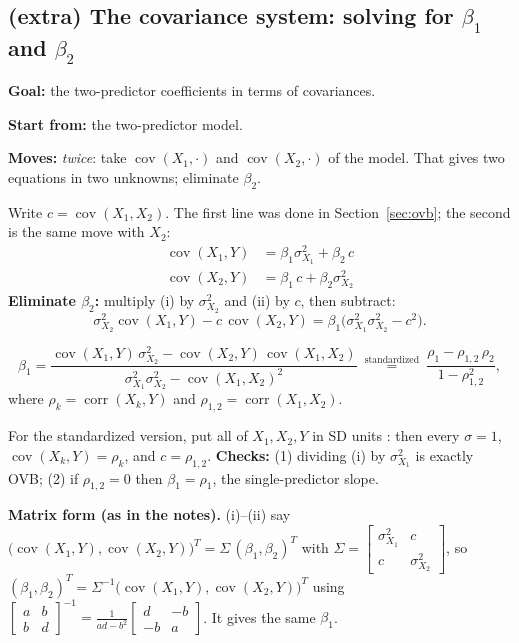 \documentclass[11pt]{article}
\newcommand{\Cov}{\operatorname{cov}}
\newcommand{\corr}{\operatorname{corr}}
\newcommand{\mv}[1]{\tcbox[on line, colback=methodclr, colframe=methodclr, coltext=white, boxsep=0pt,
  left=2pt, right=2pt, top=1pt, bottom=1pt, arc=1.5pt]{\sffamily\scriptsize\bfseries M#1}}
\newcommand{\goal}[1]{\textbf{Goal:} #1\par}
\newcommand{\start}[1]{\textbf{Start from:} #1\par}
\newcommand{\moves}[1]{\textbf{Moves:} #1\par}
\begin{document}
\subsection{(extra) The covariance system: solving for $\beta_1$ and $\beta_2$}\label{sec:system}
\begin{methodbox}
\goal{the two-predictor coefficients in terms of covariances.}
\start{the two-predictor model.}
\moves{\mv{3} \emph{twice}: take $\Cov(X_1,\cdot)$ and $\Cov(X_2,\cdot)$ of the model. That gives two equations in two unknowns; eliminate $\beta_2$.}
\end{methodbox}
Write $c=\Cov(X_1,X_2)$. The first line was done in Section~\ref{sec:ovb}; the second is the same move with $X_2$:
\begin{align*}
\Cov(X_1,Y)&=\beta_1\sigma_{X_1}^2+\beta_2\,c \tag{i}\\
\Cov(X_2,Y)&=\beta_1\,c+\beta_2\sigma_{X_2}^2 \tag{ii}
\end{align*}
\textbf{Eliminate $\beta_2$:} multiply (i) by $\sigma_{X_2}^2$ and (ii) by $c$, then subtract:
\[
\sigma_{X_2}^2\Cov(X_1,Y)-c\,\Cov(X_2,Y)=\beta_1\big(\sigma_{X_1}^2\sigma_{X_2}^2-c^2\big).
\]
\begin{keybox}
\[
\beta_1=\frac{\Cov(X_1,Y)\,\sigma_{X_2}^2-\Cov(X_2,Y)\,\Cov(X_1,X_2)}{\sigma_{X_1}^2\sigma_{X_2}^2-\Cov(X_1,X_2)^2}
\ \overset{\text{standardized}}{=}\ \frac{\rho_1-\rho_{1,2}\,\rho_2}{1-\rho_{1,2}^2},
\]
where $\rho_k=\corr(X_k,Y)$ and $\rho_{1,2}=\corr(X_1,X_2)$.
\end{keybox}
For the standardized version, put all of $X_1,X_2,Y$ in SD units \mv{6}: then every $\sigma=1$, $\Cov(X_k,Y)=\rho_k$, and $c=\rho_{1,2}$.
\textbf{Checks:} (1) dividing (i) by $\sigma_{X_1}^2$ is exactly OVB; (2) if $\rho_{1,2}=0$ then $\beta_1=\rho_1$, the single-predictor slope.

\textbf{Matrix form (as in the notes).} (i)--(ii) say $\big(\Cov(X_1,Y),\Cov(X_2,Y)\big)^T=\Sigma\,(\beta_1,\beta_2)^T$ with
$\Sigma=\begin{bmatrix}\sigma_{X_1}^2&c\\c&\sigma_{X_2}^2\end{bmatrix}$, so $(\beta_1,\beta_2)^T=\Sigma^{-1}\big(\Cov(X_1,Y),\Cov(X_2,Y)\big)^T$
using $\begin{bmatrix}a&b\\b&d\end{bmatrix}^{-1}=\frac{1}{ad-b^2}\begin{bmatrix}d&-b\\-b&a\end{bmatrix}$. It gives the same $\beta_1$.
\end{document}
